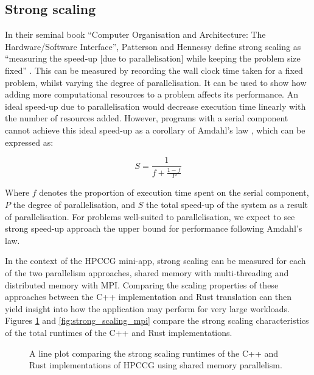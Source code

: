\subsection{Strong scaling}
\label{ssec:strong-scaling}

In their seminal book ``Computer Organisation and Architecture: The Hardware/Software Interface'', Patterson and Hennessy define strong scaling as ``measuring the speed-up [due to parallelisation] while keeping the problem size fixed'' \cite{pattersonHennessyComputerOrganisationArchitecture}. This can be measured by recording the wall clock time taken for a fixed problem, whilst varying the degree of parallelisation. It can be used to show how adding more computational resources to a problem affects its performance. An ideal speed-up due to parallelisation would decrease execution time linearly with the number of resources added. However, programs with a serial component cannot achieve this ideal speed-up as a corollary of Amdahl's law \cite{amdahlsLaw}, which can be expressed as:

\begin{equation}
    S = \frac{1}{f + \frac{1-f}{P}}
\end{equation}

Where $f$ denotes the proportion of execution time spent on the serial component, $P$ the degree of parallelisation, and $S$ the total speed-up of the system as a result of parallelisation. For problems well-suited to parallelisation, we expect to see strong speed-up approach the upper bound for performance following Amdahl's law.

In the context of the HPCCG mini-app, strong scaling can be measured for each of the two parallelism approaches, shared memory with multi-threading and distributed memory with MPI. Comparing the scaling properties of these approaches between the C++ implementation and Rust translation can then yield insight into how the application may perform for very large workloads. Figures \ref{fig:strong_scaling_threaded} and \ref{fig:strong_scaling_mpi} compare the strong scaling characteristics of the total runtimes of the C++ and Rust implementations.

\begin{figure}[H]
    \centering
    
    \caption{A line plot comparing the strong scaling runtimes of the C++ and Rust implementations of HPCCG using shared memory parallelism.}
    \label{fig:strong_scaling_threaded}
\end{figure}

